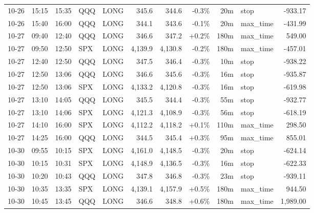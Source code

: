 \documentclass[11pt,a4paper,twoside]{article}
\begin{document}
\begin{center}
\begin{longtable}{>{\color{txtmain}}l l l l l r r r r >{\color{txtmain}}l r}
10-26 & 15:15 & 15:35 & QQQ & LONG & 345.6 & 344.6 & \textcolor{lossred}{-0.3\%} & 20m & stop & \textcolor{lossred}{-933.17} \\
10-26 & 15:40 & 16:00 & QQQ & LONG & 344.1 & 343.6 & \textcolor{lossred}{-0.1\%} & 20m & max\_time & \textcolor{lossred}{-431.99} \\
10-27 & 09:40 & 12:40 & QQQ & LONG & 346.6 & 347.2 & \textcolor{wingreen}{+0.2\%} & 180m & max\_time & \textcolor{wingreen}{549.00} \\
10-27 & 09:50 & 12:50 & SPX & LONG & 4,139.9 & 4,130.8 & \textcolor{lossred}{-0.2\%} & 180m & max\_time & \textcolor{lossred}{-457.01} \\
10-27 & 12:40 & 12:50 & QQQ & LONG & 347.5 & 346.4 & \textcolor{lossred}{-0.3\%} & 10m & stop & \textcolor{lossred}{-938.22} \\
10-27 & 12:50 & 13:06 & QQQ & LONG & 346.6 & 345.6 & \textcolor{lossred}{-0.3\%} & 16m & stop & \textcolor{lossred}{-935.87} \\
10-27 & 12:50 & 13:06 & SPX & LONG & 4,133.2 & 4,120.8 & \textcolor{lossred}{-0.3\%} & 16m & stop & \textcolor{lossred}{-619.98} \\
10-27 & 13:10 & 14:05 & QQQ & LONG & 345.5 & 344.4 & \textcolor{lossred}{-0.3\%} & 55m & stop & \textcolor{lossred}{-932.77} \\
10-27 & 13:10 & 14:06 & SPX & LONG & 4,121.3 & 4,108.9 & \textcolor{lossred}{-0.3\%} & 56m & stop & \textcolor{lossred}{-618.19} \\
10-27 & 14:10 & 16:00 & SPX & LONG & 4,112.2 & 4,118.2 & \textcolor{wingreen}{+0.1\%} & 110m & max\_time & \textcolor{wingreen}{298.50} \\
10-27 & 14:25 & 16:00 & QQQ & LONG & 344.5 & 345.4 & \textcolor{wingreen}{+0.3\%} & 95m & max\_time & \textcolor{wingreen}{855.01} \\
10-30 & 09:55 & 10:15 & SPX & LONG & 4,161.0 & 4,148.5 & \textcolor{lossred}{-0.3\%} & 20m & stop & \textcolor{lossred}{-624.14} \\
10-30 & 10:15 & 10:31 & SPX & LONG & 4,148.9 & 4,136.5 & \textcolor{lossred}{-0.3\%} & 16m & stop & \textcolor{lossred}{-622.33} \\
10-30 & 10:20 & 10:43 & QQQ & LONG & 347.8 & 346.8 & \textcolor{lossred}{-0.3\%} & 23m & stop & \textcolor{lossred}{-939.11} \\
10-30 & 10:35 & 13:35 & SPX & LONG & 4,139.1 & 4,157.9 & \textcolor{wingreen}{+0.5\%} & 180m & max\_time & \textcolor{wingreen}{944.50} \\
10-30 & 10:45 & 13:45 & QQQ & LONG & 346.6 & 348.8 & \textcolor{wingreen}{+0.6\%} & 180m & max\_time & \textcolor{wingreen}{1,989.00} \\

\end{longtable}
\end{center}
\end{document}
